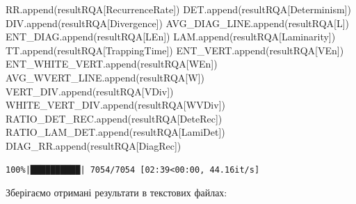 \documentclass[
  letterpaper,
]{report}
\newenvironment{Shaded}{\begin{snugshade}}{\end{snugshade}}
\newcommand{\NormalTok}[1]{\textcolor[rgb]{0.00,0.23,0.31}{#1}}
\newcommand{\StringTok}[1]{\textcolor[rgb]{0.13,0.47,0.30}{#1}}
\begin{document}
\begin{Shaded}
\begin{Highlighting}[]
\NormalTok{    RR.append(resultRQA[}\StringTok{\textquotesingle{}RecurrenceRate\textquotesingle{}}\NormalTok{])}
\NormalTok{    DET.append(resultRQA[}\StringTok{\textquotesingle{}Determinism\textquotesingle{}}\NormalTok{])}
\NormalTok{    DIV.append(resultRQA[}\StringTok{\textquotesingle{}Divergence\textquotesingle{}}\NormalTok{]) }
\NormalTok{    AVG\_DIAG\_LINE.append(resultRQA[}\StringTok{\textquotesingle{}L\textquotesingle{}}\NormalTok{])}
\NormalTok{    ENT\_DIAG.append(resultRQA[}\StringTok{\textquotesingle{}LEn\textquotesingle{}}\NormalTok{])}
\NormalTok{    LAM.append(resultRQA[}\StringTok{\textquotesingle{}Laminarity\textquotesingle{}}\NormalTok{]) }
\NormalTok{    TT.append(resultRQA[}\StringTok{\textquotesingle{}TrappingTime\textquotesingle{}}\NormalTok{]) }
\NormalTok{    ENT\_VERT.append(resultRQA[}\StringTok{\textquotesingle{}VEn\textquotesingle{}}\NormalTok{])}
\NormalTok{    ENT\_WHITE\_VERT.append(resultRQA[}\StringTok{\textquotesingle{}WEn\textquotesingle{}}\NormalTok{])}
\NormalTok{    AVG\_WVERT\_LINE.append(resultRQA[}\StringTok{\textquotesingle{}W\textquotesingle{}}\NormalTok{]) }
\NormalTok{    VERT\_DIV.append(resultRQA[}\StringTok{\textquotesingle{}VDiv\textquotesingle{}}\NormalTok{])}
\NormalTok{    WHITE\_VERT\_DIV.append(resultRQA[}\StringTok{\textquotesingle{}WVDiv\textquotesingle{}}\NormalTok{])}
\NormalTok{    RATIO\_DET\_REC.append(resultRQA[}\StringTok{\textquotesingle{}DeteRec\textquotesingle{}}\NormalTok{]) }
\NormalTok{    RATIO\_LAM\_DET.append(resultRQA[}\StringTok{\textquotesingle{}LamiDet\textquotesingle{}}\NormalTok{])}
\NormalTok{    DIAG\_RR.append(resultRQA[}\StringTok{\textquotesingle{}DiagRec\textquotesingle{}}\NormalTok{])}
\end{Highlighting}
\end{Shaded}

\begin{verbatim}
100%|██████████| 7054/7054 [02:39<00:00, 44.16it/s]
\end{verbatim}

Зберігаємо отримані результати в текстових файлах:
\end{document}
